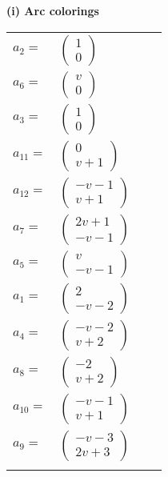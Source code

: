 \documentclass[1p]{elsarticle_modified}
\theoremstyle{definition}
\begin{document}
\flushleft \textbf{(i) Arc colorings}\\
\begin{tabular}{m{7pt} m{180pt} m{7pt} m{180pt} }
\flushright $a_{2}=$&$\begin{pmatrix}1\\0\end{pmatrix}$ \\
\flushright $a_{6}=$&$\begin{pmatrix}v\\0\end{pmatrix}$ \\
\flushright $a_{3}=$&$\begin{pmatrix}1\\0\end{pmatrix}$ \\
\flushright $a_{11}=$&$\begin{pmatrix}0\\v+1\end{pmatrix}$ \\
\flushright $a_{12}=$&$\begin{pmatrix}- v-1\\v+1\end{pmatrix}$ \\
\flushright $a_{7}=$&$\begin{pmatrix}2 v+1\\- v-1\end{pmatrix}$ \\
\flushright $a_{5}=$&$\begin{pmatrix}v\\- v-1\end{pmatrix}$ \\
\flushright $a_{1}=$&$\begin{pmatrix}2\\- v-2\end{pmatrix}$ \\
\flushright $a_{4}=$&$\begin{pmatrix}- v-2\\v+2\end{pmatrix}$ \\
\flushright $a_{8}=$&$\begin{pmatrix}-2\\v+2\end{pmatrix}$ \\
\flushright $a_{10}=$&$\begin{pmatrix}- v-1\\v+1\end{pmatrix}$ \\
\flushright $a_{9}=$&$\begin{pmatrix}- v-3\\2 v+3\end{pmatrix}$\\&\end{tabular}
\end{document}
